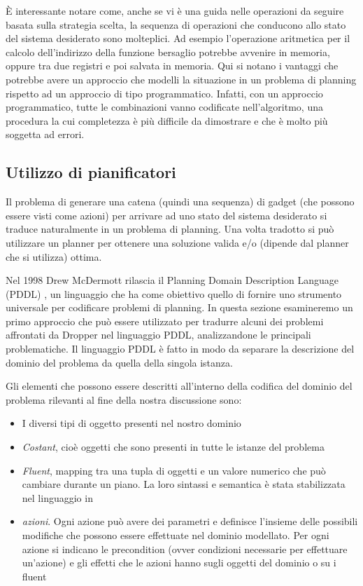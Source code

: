 È interessante notare come, anche se vi è una guida nelle operazioni
da seguire basata sulla strategia scelta, la sequenza di operazioni
che conducono allo stato del sistema desiderato sono molteplici. Ad
esempio l'operazione aritmetica per il calcolo dell'indirizzo della
funzione bersaglio potrebbe avvenire in memoria, oppure tra due
registri e poi salvata in memoria. Qui si notano i vantaggi che
potrebbe avere un approccio che modelli la situazione in un problema
di planning rispetto ad un approccio di tipo programmatico. Infatti,
con un approccio programmatico, tutte le combinazioni vanno codificate
nell'algoritmo, una procedura la cui completezza è più difficile da
dimostrare e che è molto più soggetta ad errori.

\subsection{Utilizzo di pianificatori}
\label{sec:pddl}

Il problema di generare una catena (quindi una sequenza) di gadget
(che possono essere visti come azioni) per arrivare ad uno stato del
sistema desiderato si traduce naturalmente in un problema di
planning. Una volta tradotto si può utilizzare un planner per ottenere
una soluzione valida e/o (dipende dal planner che si utilizza)
ottima.

Nel 1998 Drew McDermott rilascia il Planning Domain Description
Language (PDDL) \cite{pddl-97,fox-03}, un linguaggio che ha come
obiettivo quello di fornire uno strumento universale per codificare
problemi di planning. In questa sezione esamineremo un primo approccio
che può essere utilizzato per tradurre alcuni dei problemi affrontati
da Dropper nel linguaggio PDDL, analizzandone le principali
problematiche. Il linguaggio PDDL è fatto in modo da separare la
descrizione del dominio del problema da quella della singola istanza.

Gli elementi che possono essere descritti all'interno della codifica
del dominio del problema rilevanti al fine della nostra discussione sono:
\begin{itemize}
\item I diversi tipi di oggetto presenti nel nostro dominio
\item \emph{Costant}, cioè oggetti che sono presenti in tutte le istanze del problema
\item \emph{Fluent}, mapping tra una tupla di oggetti e un valore
  numerico che può cambiare durante un piano. La loro sintassi e
  semantica è stata stabilizzata nel linguaggio in \cite{fox-03}
\item \emph{azioni}. Ogni azione può avere dei parametri e definisce
  l'insieme delle possibili modifiche che possono essere effettuate
  nel dominio modellato. Per ogni azione si indicano le precondition
  (ovver condizioni necessarie per effettuare un'azione) e gli effetti
  che le azioni hanno sugli oggetti del dominio o su i fluent
\end{itemize}

